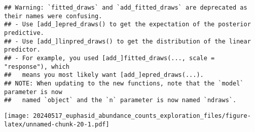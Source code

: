 \documentclass[
]{article}
\begin{document}
\begin{verbatim}
## Warning: `fitted_draws` and `add_fitted_draws` are deprecated as their names were confusing.
## - Use [add_]epred_draws() to get the expectation of the posterior predictive.
## - Use [add_]linpred_draws() to get the distribution of the linear predictor.
## - For example, you used [add_]fitted_draws(..., scale = "response"), which
##   means you most likely want [add_]epred_draws(...).
## NOTE: When updating to the new functions, note that the `model` parameter is now
##   named `object` and the `n` parameter is now named `ndraws`.
\end{verbatim}

\texttt{[image: 20240517\_euphasid\_abundance\_counts\_exploration\_files/figure-latex/unnamed-chunk-20-1.pdf]}
\end{document}
